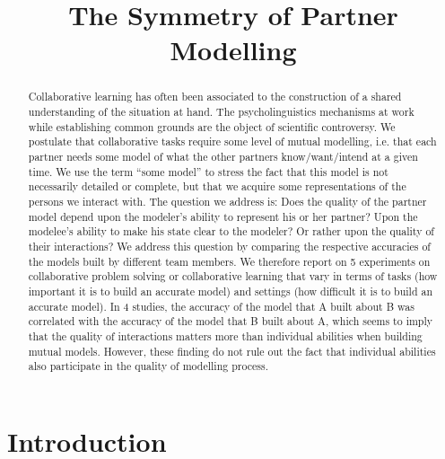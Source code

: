\documentclass[natbib]{svjour3}
\title{The Symmetry of Partner Modelling}
\author{}
\newcommand{\ie}{i.e.\xspace}
\newcommand{\A}{A\xspace}
\newcommand{\B}{B\xspace}
\begin{document}
\maketitle

\begin{abstract}

Collaborative learning has often been associated to the construction of  a
shared   understanding of the situation at hand. The psycholinguistics
mechanisms at work while establishing common grounds are the object of
scientific controversy. We postulate that collaborative tasks require some
level of mutual modelling, \ie that each partner needs some model of what
the other partners know/want/intend at a given time.  We use the term ``some
model'' to stress the fact that this model is not necessarily detailed or
complete, but that we acquire some representations of the persons we
interact with. The question we address is: Does the quality of the partner
model depend upon the modeler's ability to represent his or her partner?
Upon the modelee's ability to make his state clear to the modeler? Or rather upon
the quality of their interactions? We address this question by comparing
the respective accuracies of the models built by different team
members. We therefore report on 5 experiments on collaborative problem solving
or collaborative learning that vary in terms of tasks (how important it is
to build an accurate model) and settings (how difficult it is to build an
accurate model). In 4 studies, the accuracy of the model that \A built about
\B was correlated with the accuracy of the model that \B built about \A,  which
seems to imply that the quality of interactions matters more than individual
abilities when building mutual models.  However, these finding do not
rule out the fact that individual abilities also participate in the quality of
modelling process.


\end{abstract}


\section{Introduction}
\end{document}
